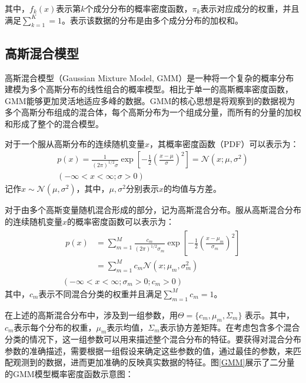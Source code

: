 其中，$f_k(x)$表示第$k$个成分分布的概率密度函数，$\pi_k$表示对应成分的权重，并且满足$\sum_{k=1}^{K}=1$。表示该数据的分布是由多个成分分布的加权和。

\subsection{高斯混合模型}
高斯混合模型（Gaussian Mixture Model, GMM）是一种将一个复杂的概率分布建模为多个高斯分布的线性组合的概率模型。相比于单一的高斯概率密度函数，GMM能够更加灵活地适应多峰的数据。GMM的核心思想是将观察到的数据视为多个高斯分布组成的混合体，每个高斯分布为一个组成分量，而所有的分量的加权和形成了整个的混合模型。

对于一个服从高斯分布的连续随机变量$x$，其概率密度函数（PDF）可以表示为：
\begin{equation}
  \begin{gathered}
    p\left( x \right) =\frac{1}{\left( 2\pi \right) ^{1/2}\sigma}\exp \left[ -\frac{1}{2}\left( \frac{x-\mu}{\sigma} \right) ^2 \right] =\mathcal{N} \left( x;\mu ,\sigma ^2 \right)
    \\
    \left( -\infty <x<\infty ;\sigma >0 \right)
  \end{gathered}
\end{equation}
记作$x \sim \mathcal{N}(\mu,\sigma^2)$，其中，$\mu,\sigma^2$分别表示$x$的均值与方差。

对于由多个高斯变量随机混合形成的部分，记为高斯混合分布。服从高斯混合分布的连续随机变量$x$的概率密度函数可以表示为：
\begin{equation}
  \begin{gathered}
    \begin{aligned}
      p(x) & =\sum_{m=1}^M \frac{c_m}{(2 \pi)^{1 / 2} \sigma_m} \exp \left[-\frac{1}{2}\left(\frac{x-\mu_m}{\sigma_m}\right)^2\right] \\ & =\sum_{m=1}^M c_m \mathcal{N}\left(x ; \mu_m, \sigma_m^2\right)
    \end{aligned}
    \\
    \left(-\infty<x<\infty ; \sigma_m>0 ; c_m>0\right)
  \end{gathered}
\end{equation}
其中，$c_m$表示不同混合分类的权重并且满足$\sum_{m=1}^M c_m=1$。

在上述的高斯混合分布中，涉及到一组参数，用$\Theta = \{c_m, \mu_m, \Sigma_m\}$ 表示。其中，$c_m$表示每个分布的权重，$\mu_m$表示均值，$\Sigma_m$表示协方差矩阵。在考虑包含多个混合分类的情况下，这一组参数可以用来描述整个混合分布的特征。要获得对混合分布参数的准确描述，需要根据一组假设来确定这些参数的值，通过最佳的参数，来匹配观测到的数据，进而更加准确的反映真实数据的特征。图\ref{GMM}展示了二分量的GMM模型概率密度函数示意图：

